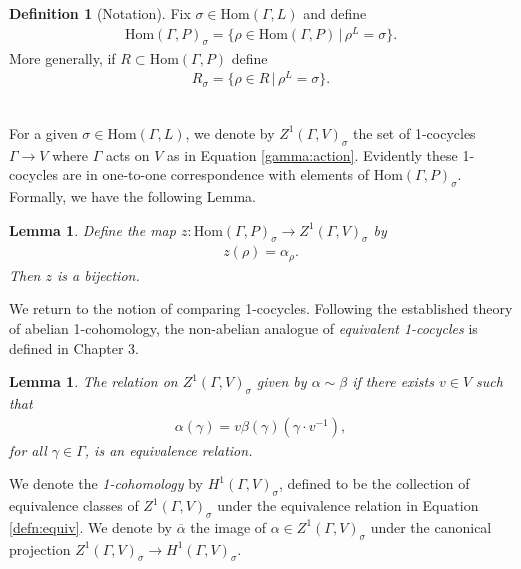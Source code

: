 \documentclass[12pt, a4paper]{amsart}
\numberwithin{equation}{section}
\newtheorem{lem}[equation]{Lemma}
\theoremstyle{definition}
\newtheorem{defn}[equation]{Definition}
\theoremstyle{remark}
\theoremstyle{remark}
\begin{document}
\begin{defn}[Notation] \label{defn:homsigma} Fix $\sigma \in \mathrm{Hom}(\Gamma, L)$ and define
\begin{eqnarray} \mathrm{Hom}(\Gamma, P)_\sigma = \{\rho \in \mathrm{Hom}(\Gamma, P) \,|\, \rho^L = \sigma \}. \end{eqnarray}
More generally, if $R \subset \mathrm{Hom}(\Gamma, P)$ define
\begin{eqnarray} \label{defn:rsigma} R_\sigma = \{\rho \in R \,|\, \rho^L = \sigma \}. \end{eqnarray}
\end{defn}
\quad \\


For a given $\sigma \in \mathrm{Hom}(\Gamma, L)$, we denote by $Z^1(\Gamma, V)_\sigma$ the set of 1-cocycles $\Gamma \rightarrow V$ where $\Gamma$ acts on $V$ as in Equation \ref{gamma:action}. Evidently these 1-cocycles are in one-to-one correspondence with elements of $\mathrm{Hom}(\Gamma, P)_\sigma$. Formally, we have the following Lemma.

\begin{lem} \label{hom:z1}
Define the map $z:\mathrm{Hom}(\Gamma, P)_\sigma \rightarrow Z^1(\Gamma, V)_\sigma$ by
\begin{eqnarray} \label{z}
	z(\rho) = \alpha_\rho.
\end{eqnarray}
Then $z$ is a bijection.
\end{lem}

We return to the notion of comparing 1-cocycles. Following the established theory of abelian 1-cohomology, the non-abelian analogue of \emph{equivalent 1-cocycles} is defined in Chapter 3.


\begin{lem} The relation on $Z^1(\Gamma, V)_\sigma$ given by $\alpha \sim \beta$ if there exists $v \in V$ such that
\begin{eqnarray}\label{defn:equiv} 
	\alpha(\gamma) = v\beta(\gamma)(\gamma \cdot v^{-1}),
\end{eqnarray}
for all $\gamma \in \Gamma$, is an equivalence relation.
\end{lem}

We denote the \emph{1-cohomology} by $H^1(\Gamma, V)_\sigma$, defined to be the collection of equivalence classes of $Z^1(\Gamma, V)_\sigma$ under the equivalence relation in Equation \ref{defn:equiv}. We denote by $\overline{\alpha}$ the image of $\alpha \in Z^1(\Gamma, V)_\sigma$ under the canonical projection $Z^1(\Gamma, V)_\sigma \rightarrow H^1(\Gamma, V)_\sigma$.
\end{document}
